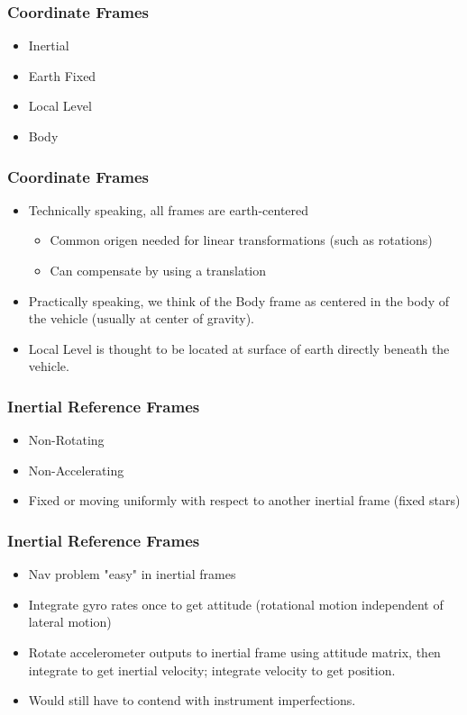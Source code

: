 \begin{frame}
\frametitle{Coordinate Frames}
 \begin{itemize}
 \item Inertial
 \item Earth Fixed
 \item Local Level
 \item Body
\end{itemize}
\end{frame}
\begin{frame}
\frametitle{Coordinate Frames}
 \begin{itemize}
  \item Technically speaking, all frames are earth-centered
  \begin{itemize}
    \item Common origen needed for linear transformations (such as rotations)
    \item Can compensate by using a translation
  \end{itemize}
  \item Practically speaking, we think of the Body frame as centered in the body of the vehicle (usually at center of gravity).
  \item Local Level is thought to be located at surface of earth directly beneath the vehicle.
\end{itemize}
\end{frame}
\begin{frame}
\frametitle{Inertial Reference Frames}
 \begin{itemize}
 \item Non-Rotating
 \item Non-Accelerating
 \item Fixed or moving uniformly with respect to another inertial
 frame (fixed stars)
\end{itemize}
\end{frame}

\begin{frame}
\frametitle{Inertial Reference Frames}
 \begin{itemize}
 \item Nav problem "easy" in inertial frames
 \item Integrate gyro rates once to get attitude (rotational motion independent of lateral motion)
 \item Rotate accelerometer outputs to inertial frame using attitude matrix, then integrate to get inertial
 velocity; integrate velocity to get position.
 \item Would still have to contend with instrument imperfections.
\end{itemize}
\end{frame}

